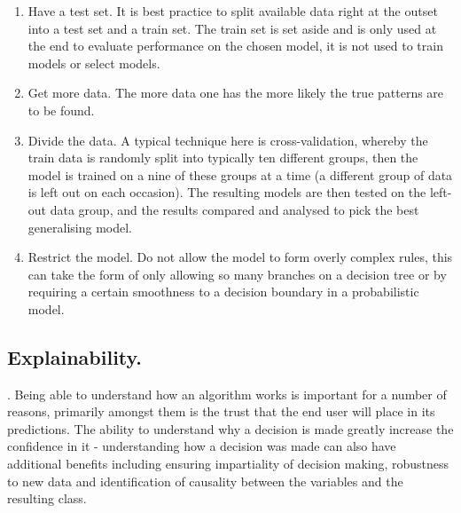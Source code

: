 \begin{enumerate}

\item{Have a test set.} It is best practice to split available data right at the outset into a test set and a train set. The train set is set aside and is only used at the end to evaluate performance on the chosen model, it is not used to train models or select models.

\item{Get more data.} The more data one has the more likely the true patterns are to be found.

\item{Divide the data.} A typical technique here is cross-validation, whereby the train data is randomly split into typically ten different groups, then the model is trained on a nine of these groups at a time (a different group of data is left out on each occasion). The resulting models are then tested on the left-out data group, and the results compared and analysed to pick the best generalising model.

\item{Restrict the model.} Do not allow the model to form overly complex rules, this can take the form of only allowing so many branches on a decision tree or by requiring a certain smoothness to a decision boundary in a probabilistic model. 

\end{enumerate} 


\subsection{Explainability.}   \parencite{arrieta2020explainable}. Being able to understand how an algorithm works is important for a number of reasons, primarily amongst them is the trust that the end user will place in its predictions. The ability to understand why a decision is made greatly increase the confidence in it - understanding how a decision was made can also have additional benefits including ensuring impartiality of decision making, robustness to new data and identification of causality between the variables and the resulting class. 

